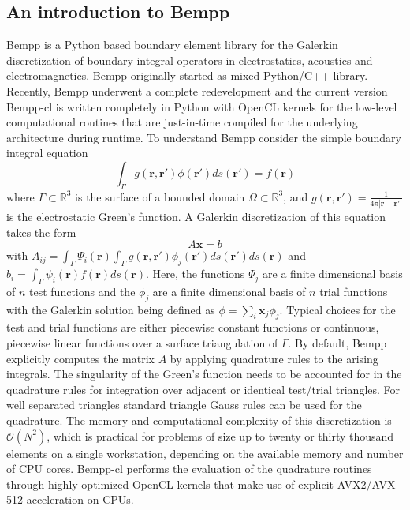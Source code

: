 \subsection{An introduction to Bempp}
Bempp \cite{Betcke2021} is a Python based boundary element library for the Galerkin discretization of boundary integral operators in electrostatics, acoustics and electromagnetics.
Bempp originally started as mixed Python/C++ library.
Recently, Bempp underwent a complete redevelopment and the current version Bempp-cl is written completely in Python with OpenCL kernels for the low-level computational routines that are just-in-time compiled for the underlying architecture during runtime.
To understand Bempp consider the simple boundary integral equation
$$
\int_{\Gamma} g(\mathbf{r}, \mathbf{r'}) \phi(\mathbf{r'})ds(\mathbf{r'}) = f(\mathbf{r})
$$
where $\Gamma\subset\mathbb{R}^3$ is the surface of a bounded domain $\Omega\subset\mathbb{R}^3$, and $g(\mathbf{r}, \mathbf{r'}) = \frac{1}{4\pi|\mathbf{r}-\mathbf{r'}|}$ is the electrostatic Green's function.
A Galerkin discretization of this equation takes the form
$$
A\mathbf{x} = b
$$
with $A_{ij} = \int_{\Gamma}\Psi_i(\mathbf{r})\int_{\Gamma}g(\mathbf{r}, \mathbf{r'})\phi_j(\mathbf{r'})ds(\mathbf{r'})ds(\mathbf{r})$ and $b_i = \int_{\Gamma}\psi_i(\mathbf{r})f(\mathbf{r})ds(\mathbf{r})$.
Here, the functions $\Psi_j$ are a finite dimensional basis of $n$ test functions and the $\phi_j$ are a finite dimensional basis of $n$ trial functions with the Galerkin solution being defined as $\phi=\sum_{i}\mathbf{x}_j\phi_j$.
Typical choices for the test and trial functions are either piecewise constant functions or continuous, piecewise linear functions over a surface triangulation of $\Gamma$. 
By default, Bempp explicitly computes the matrix $A$ by applying quadrature rules to the arising integrals.
The singularity of the Green's function needs to be accounted for in the quadrature rules for integration over adjacent or identical test/trial triangles.
For well separated triangles standard triangle Gauss rules can be used for the quadrature.
The memory and computational complexity of this discretization is $\mathcal{O}(N^2)$, which is practical for problems of size up to twenty or thirty thousand elements on a single workstation, depending on the available memory and number of CPU cores.
Bempp-cl performs the evaluation of the quadrature routines through highly optimized OpenCL kernels that make use of explicit AVX2/AVX-512 acceleration on CPUs.


